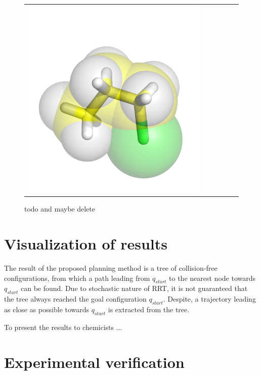 \documentclass{svmult}
\def\qstart{q_{start}}
\def\qinit{\qstart}
\def\qgoal{\qstart}
\begin{document}
\begin{figure}
\begin{tabular}{cccccc}
\includegraphics[width=\tmpa]{fig/m003-011} \\

\end{tabular}
\caption{todo and maybe delete}
\end{figure}

\section{Visualization of results}

The result of the proposed planning method is a tree of collision-free configurations, from which a path leading from $\qinit$
to the nearest node towards $\qgoal$ can be found.
Due to stochastic nature of RRT, it is not guaranteed that the tree always reached the goal configuration $\qgoal$.
Despite, a trajectory leading as close as possible towards $\qgoal$ is extracted from the tree.

To present the results to chemicists ...

\section{Experimental verification}
\end{document}
